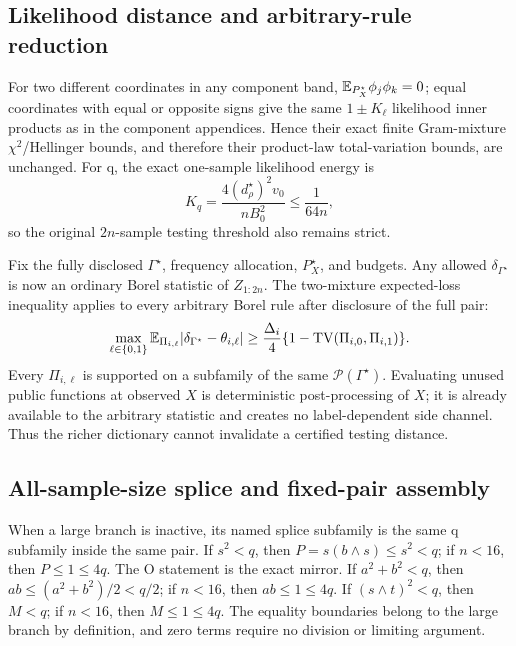 \subsection{Likelihood distance and arbitrary-rule reduction}

For two different coordinates in any component band,
\(\mathbb E_{P_X^\star}\phi_j\phi_k=0\); equal coordinates with equal or opposite
signs give the same \(1\pm K_\ell\) likelihood inner products as in the
component appendices.  Hence their exact finite Gram-mixture
\(\chi^2\)/Hellinger bounds, and therefore their product-law total-variation
bounds, are unchanged.  For q, the exact one-sample likelihood energy is
\[
 K_q=\frac{4(d_\rho^\star)^2v_0}{nB_0^2}\le\frac1{64n},
\]
so the original \(2n\)-sample testing threshold also remains strict.

Fix the fully disclosed \(\Gamma^\star\), frequency allocation, \(P_X^\star\),
and budgets.  Any allowed \(\delta_{\Gamma^\star}\) is now an ordinary Borel
statistic of \(Z_{1:2n}\).  The two-mixture expected-loss inequality applies
to every arbitrary Borel rule after disclosure of the full pair:
\[
 \max_{\ell\in\{0,1\}}
 \mathbb E_{\Pi_{i,\ell}}\!
 \left|\delta_{\Gamma^\star}-\theta_{i,\ell}\right|
 \ge \frac{\Delta_i}{4}
 \{1-\operatorname{TV}(\Pi_{i,0},\Pi_{i,1})\}.
\]
Every \(\Pi_{i,\ell}\) is supported on a subfamily of the same
\(\mathcal P(\Gamma^\star)\).  Evaluating unused public functions at observed
\(X\) is deterministic post-processing of \(X\); it is already available to
the arbitrary statistic and creates no label-dependent side channel.  Thus
the richer dictionary cannot invalidate a certified testing distance.

\subsection{All-sample-size splice and fixed-pair assembly}

When a large branch is inactive, its named splice subfamily is the same q
subfamily inside the same pair.  If \(s^2<q\), then
\(P=s(b\wedge s)\le s^2<q\); if \(n<16\), then \(P\le1\le4q\).
The O statement is the exact mirror.  If \(a^2+b^2<q\), then
\(ab\le(a^2+b^2)/2<q/2\); if \(n<16\), then \(ab\le1\le4q\).
If \((s\wedge t)^2<q\), then \(M<q\); if \(n<16\), then
\(M\le1\le4q\).  The equality boundaries belong to the large branch by
definition, and zero terms require no division or limiting argument.

